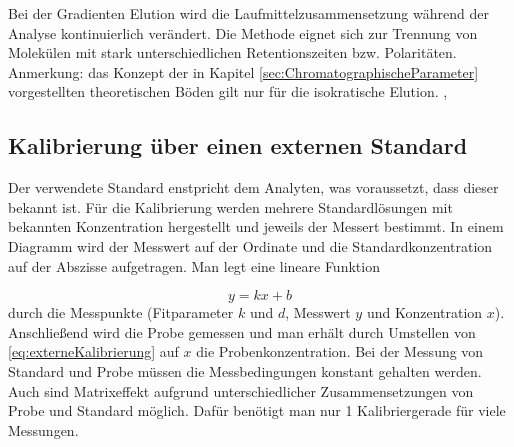       Bei der Gradienten Elution wird die Laufmittelzusammensetzung während der Analyse kontinuierlich verändert. Die Methode eignet sich zur Trennung von Molekülen mit stark unterschiedlichen Retentionszeiten bzw. Polaritäten. Anmerkung: das Konzept der in Kapitel \ref{sec:ChromatographischeParameter} vorgestellten theoretischen Böden gilt nur für die isokratische Elution. \citep[S. 156]{Taschenatlas}, \citep{SkriptHPLC}
   
  \subsection{Kalibrierung über einen externen Standard}  
  
    Der verwendete Standard enstpricht dem Analyten, was voraussetzt, dass dieser bekannt ist. Für die Kalibrierung werden mehrere Standardlösungen mit bekannten Konzentration hergestellt und jeweils der Messert bestimmt. In einem Diagramm wird der Messwert auf der Ordinate und die Standardkonzentration auf der Abszisse aufgetragen. Man legt eine lineare Funktion 
    
      \begin{equation}
        y = k x + b \label{eq:externeKalibrierung}
      \end{equation}
    durch die Messpunkte (Fitparameter $k$ und $d$, Messwert $y$ und Konzentration $x$). Anschließend wird die Probe gemessen und man erhält durch Umstellen von \eqref{eq:externeKalibrierung} auf $x$ die Probenkonzentration. Bei der Messung von Standard und Probe müssen die Messbedingungen konstant gehalten werden. Auch sind Matrixeffekt aufgrund unterschiedlicher Zusammensetzungen von Probe und Standard möglich. Dafür benötigt man nur 1 Kalibriergerade für viele Messungen. 
  
      